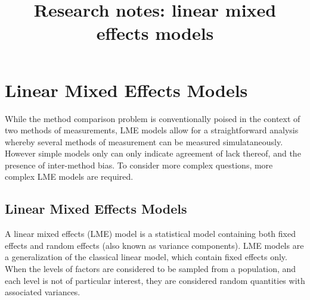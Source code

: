 \documentclass[12pt, a4paper]{report}
\title{Research notes: linear mixed effects models}
\author{ } \date{ }
\theoremstyle{plain}
\theoremstyle{definition}
\theoremstyle{remark}
\begin{document}
	\tableofcontents

	
%	
%	
%	  

\chapter{Linear Mixed Effects Models}
While the method comparison problem is conventionally poised in the context of two methods of measurements, LME models allow for a straightforward analysis whereby several methods of measurement can be measured simulataneously. However simple models only can only indicate agreement of lack thereof, and the presence of inter-method bias. To consider more complex questions, more complex LME models are required.			
\section{Linear Mixed Effects Models}
A linear mixed effects (LME) model is a statistical model containing both fixed effects and random effects (also known as variance components). LME models are a generalization of the classical linear model, which contain fixed effects only. When the levels of factors are considered to be sampled from a population, and each level is not of particular interest, they are considered random quantities with associated variances.
			
\end{document}
